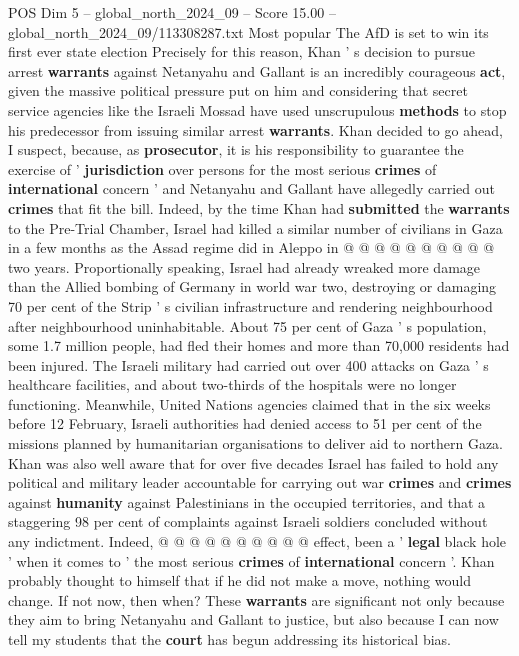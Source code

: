 \begin{textsample}{POS Dim 5 – global\_north\_2024\_09 – Score 15.00 – global\_north\_2024\_09/113308287.txt}
Most popular The AfD is set to win its first ever state election Precisely for this reason, Khan ' s decision to pursue arrest \textbf{warrants} against Netanyahu and Gallant is an incredibly courageous \textbf{act}, given the massive political pressure put on him and considering that secret service agencies like the Israeli Mossad have used unscrupulous \textbf{methods} to stop his predecessor from issuing similar arrest \textbf{warrants}.
Khan decided to go ahead, I suspect, because, as \textbf{prosecutor}, it is his responsibility to guarantee the exercise of ' \textbf{jurisdiction} over persons for the most serious \textbf{crimes} of \textbf{international} concern ' and Netanyahu and Gallant have allegedly carried out \textbf{crimes} that fit the bill.
Indeed, by the time Khan had \textbf{submitted} the \textbf{warrants} to the Pre-Trial Chamber, Israel had killed a similar number of civilians in Gaza in a few months as the Assad regime did in Aleppo in @ @ @ @ @ @ @ @ @ @ two years.
Proportionally speaking, Israel had already wreaked more damage than the Allied bombing of Germany in world war two, destroying or damaging 70 per cent of the Strip ' s civilian infrastructure and rendering neighbourhood after neighbourhood uninhabitable.
About 75 per cent of Gaza ' s population, some 1.7 million people, had fled their homes and more than 70,000 residents had been injured.
The Israeli military had carried out over 400 attacks on Gaza ' s healthcare facilities, and about two-thirds of the hospitals were no longer functioning.
Meanwhile, United Nations agencies claimed that in the six weeks before 12 February, Israeli authorities had denied access to 51 per cent of the missions planned by humanitarian organisations to deliver aid to northern Gaza.
Khan was also well aware that for over five decades Israel has failed to hold any political and military leader accountable for carrying out war \textbf{crimes} and \textbf{crimes} against \textbf{humanity} against Palestinians in the occupied territories, and that a staggering 98 per cent of complaints against Israeli soldiers concluded without any indictment.
Indeed, @ @ @ @ @ @ @ @ @ @ effect, been a ' \textbf{legal} black hole ' when it comes to ' the most serious \textbf{crimes} of \textbf{international} concern '.
Khan probably thought to himself that if he did not make a move, nothing would change.
If not now, then when?
These \textbf{warrants} are significant not only because they aim to bring Netanyahu and Gallant to justice, but also because I can now tell my students that the \textbf{court} has begun addressing its historical bias.

\end{textsample}
